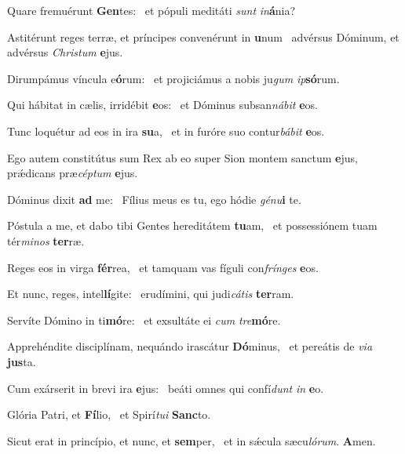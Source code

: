 \item Quare fremuérunt \textbf{Gen}tes:~\psstar{} et pópuli meditáti \textit{sunt} \textit{in}\textbf{á}nia?
\item Astitérunt reges terræ, et príncipes convenérunt in \textbf{u}num~\psstar{} advérsus Dóminum, et advérsus \textit{Chris}\textit{tum} \textbf{e}jus.
\item Dirumpámus víncula e\textbf{ó}rum:~\psstar{} et projiciámus a nobis ju\textit{gum} \textit{ip}\textbf{só}rum.
\item Qui hábitat in cælis, irridébit \textbf{e}os:~\psstar{} et Dóminus subsan\textit{ná}\textit{bit} \textbf{e}os.
\item Tunc loquétur ad eos in ira \textbf{su}a,~\psstar{} et in furóre suo contur\textit{bá}\textit{bit} \textbf{e}os.
\item Ego autem constitútus sum Rex ab eo super Sion montem sanctum \textbf{e}jus,~\psstar{} prǽdicans præ\textit{cép}\textit{tum} \textbf{e}jus.
\item Dóminus dixit \textbf{ad} me:~\psstar{} Fílius meus es tu, ego hódie \textit{gé}\textit{nu}\textbf{i} te.
\item Póstula a me, et dabo tibi Gentes hereditátem \textbf{tu}am,~\psstar{} et possessiónem tuam tér\textit{mi}\textit{nos} \textbf{ter}ræ.
\item Reges eos in virga \textbf{fér}rea,~\psstar{} et tamquam vas fíguli con\textit{frín}\textit{ges} \textbf{e}os.
\item Et nunc, reges, intel\textbf{lí}gite:~\psstar{} erudímini, qui judi\textit{cá}\textit{tis} \textbf{ter}ram.
\item Servíte Dómino in ti\textbf{mó}re:~\psstar{} et exsultáte ei \textit{cum} \textit{tre}\textbf{mó}re.
\item Apprehéndite disciplínam, nequándo irascátur \textbf{Dó}minus,~\psstar{} et pereátis de \textit{vi}\textit{a} \textbf{jus}ta.
\item Cum exárserit in brevi ira \textbf{e}jus:~\psstar{} beáti omnes qui confí\textit{dunt} \textit{in} \textbf{e}o.
\item Glória Patri, et \textbf{Fí}lio,~\psstar{} et Spirí\textit{tu}\textit{i} \textbf{Sanc}to.
\item Sicut erat in princípio, et nunc, et \textbf{sem}per,~\psstar{} et in sǽcula sæcu\textit{ló}\textit{rum}. \textbf{A}men.
